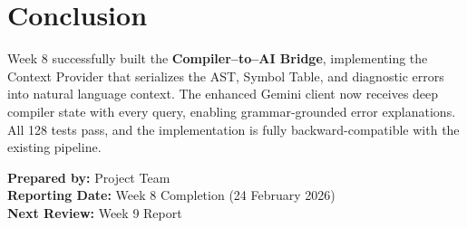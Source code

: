 \documentclass[a4paper,11pt]{article}
\begin{document}
    \section{Conclusion}

    Week 8 successfully built the \textbf{Compiler--to--AI Bridge}, implementing the Context Provider that serializes the AST, Symbol Table, and diagnostic errors into natural language context. The enhanced Gemini client now receives deep compiler state with every query, enabling grammar-grounded error explanations. All 128 tests pass, and the implementation is fully backward-compatible with the existing pipeline.

    \vspace{5mm}
    \noindent\textbf{Prepared by:} Project Team \\
    \textbf{Reporting Date:} Week 8 Completion (24 February 2026) \\
    \textbf{Next Review:} Week 9 Report

    
\end{document}
